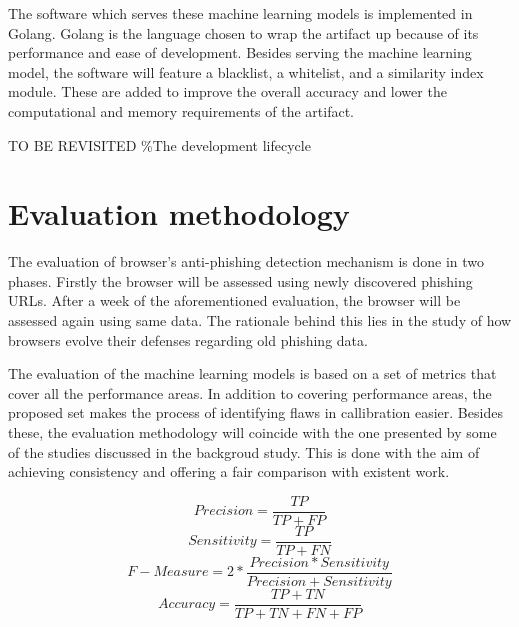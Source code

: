 The software which serves these machine learning models is implemented in Golang. Golang is the language chosen to wrap the artifact up because of its performance and ease of development. Besides serving the machine learning model, the software will feature a blacklist, a whitelist, and a similarity index module. These are added to improve the overall accuracy and lower the computational and memory requirements of the artifact.

TO BE REVISITED
\%The development lifecycle

\section{Evaluation methodology}
The evaluation of browser's anti-phishing detection mechanism is done in two phases. Firstly the browser will be assessed using newly discovered phishing URLs. After a week of the aforementioned evaluation, the browser will be assessed again using same data. The rationale behind this lies in the study of how browsers evolve their defenses regarding old phishing data.

The evaluation of the machine learning models is based on a set of metrics that cover all the performance areas. In addition to covering performance areas, the proposed set makes the process of identifying flaws in callibration easier. Besides these, the evaluation methodology will coincide with the one presented by some of the studies discussed in the backgroud study. This is done with the aim of achieving consistency and offering a fair comparison with existent work.\newline


\begin{equation}
	\label{eq:PRECISION}
	Precision = \frac{TP}{TP+FP}
\end{equation}
\begin{equation}
	\label{eq:SENSITIVITY}
	Sensitivity = \frac{TP}{TP+FN}
\end{equation}
\begin{equation}
	\label{eq:FMEASURE}
	F-Measure = 2*\frac{Precision * Sensitivity}{Precision + Sensitivity}
\end{equation}
\begin{equation}
	\label{eq:ACCURACY}
	Accuracy = \frac{TP+TN}{TP+TN+FN+FP}
\end{equation}
\newline

